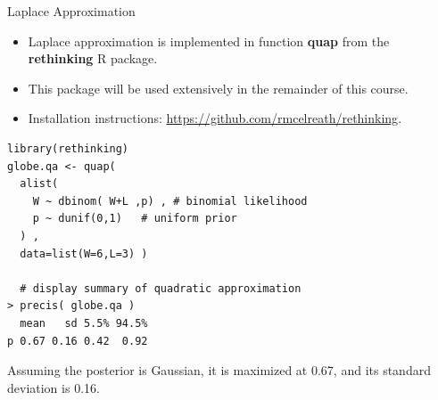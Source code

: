 \documentclass[handout]{beamer}
\begin{document}
\begin{frame}[fragile]{Laplace Approximation}



\begin{scriptsize}

\begin{itemize}
 \item Laplace approximation is implemented in function \textbf{quap} from the \textbf{rethinking} R package.
 
 \item This package  will be used extensively in the remainder of this course.
 
 \item Installation instructions: \url{https://github.com/rmcelreath/rethinking}.
 
\end{itemize}
 \begin{verbatim}
library(rethinking)
globe.qa <- quap(
  alist(
    W ~ dbinom( W+L ,p) , # binomial likelihood
    p ~ dunif(0,1)   # uniform prior
  ) ,
  data=list(W=6,L=3) )

  # display summary of quadratic approximation
> precis( globe.qa )
  mean   sd 5.5% 94.5%
p 0.67 0.16 0.42  0.92

\end{verbatim}
Assuming the posterior is Gaussian, it is maximized at 0.67, and its standard deviation is 0.16.
\end{scriptsize}


\end{frame}
\end{document}
